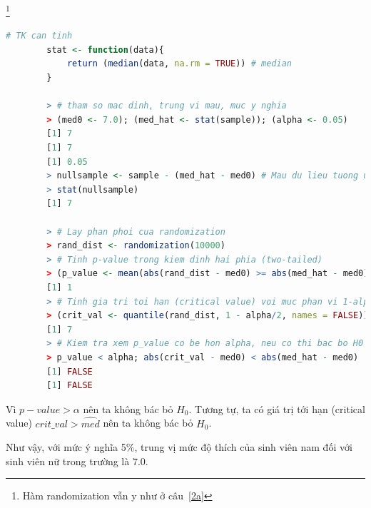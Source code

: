 \documentclass[a4paper,12pt]{article}
\begin{document}
\begin{enumerate}[label = \alph*)]
		\footnote{Hàm randomization vẫn y như ở câu~\ref{2a}}
		\begin{lstlisting}[language=R]
		# TK can tinh
		stat <- function(data){
			return (median(data, na.rm = TRUE)) # median
		}
		
		> # tham so mac dinh, trung vi mau, muc y nghia
		> (med0 <- 7.0); (med_hat <- stat(sample)); (alpha <- 0.05)
		[1] 7
		[1] 7
		[1] 0.05
		> nullsample <- sample - (med_hat - med0) # Mau du lieu tuong ung voi H0
		> stat(nullsample)
		[1] 7
		 
		> # Lay phan phoi cua randomization
		> rand_dist <- randomization(10000)
		> # Tinh p-value trong kiem dinh hai phia (two-tailed)
		> (p_value <- mean(abs(rand_dist - med0) >= abs(med_hat - med0)))
		[1] 1
		> # Tinh gia tri toi han (critical value) voi muc phan vi 1-alpha/2
		> (crit_val <- quantile(rand_dist, 1 - alpha/2, names = FALSE))
		[1] 7
		> # Kiem tra xem p_value co be hon alpha, neu co thi bac bo H0
		> p_value < alpha; abs(crit_val - med0) < abs(med_hat - med0)
		[1] FALSE
		[1] FALSE
		\end{lstlisting}
		
		Vì $p-value > \alpha$ nên ta không bác bỏ $H_0$. Tương tự, ta có giá trị tới hạn (critical value) $crit\_val > \hat{med}$ nên ta không bác bỏ $H_0$. 
		
		Như vậy, với mức ý nghĩa 5\%, trung vị mức độ thích của sinh viên nam đối với sinh viên nữ trong trường là $7.0$. 
	\end{enumerate}
	
\end{document}
